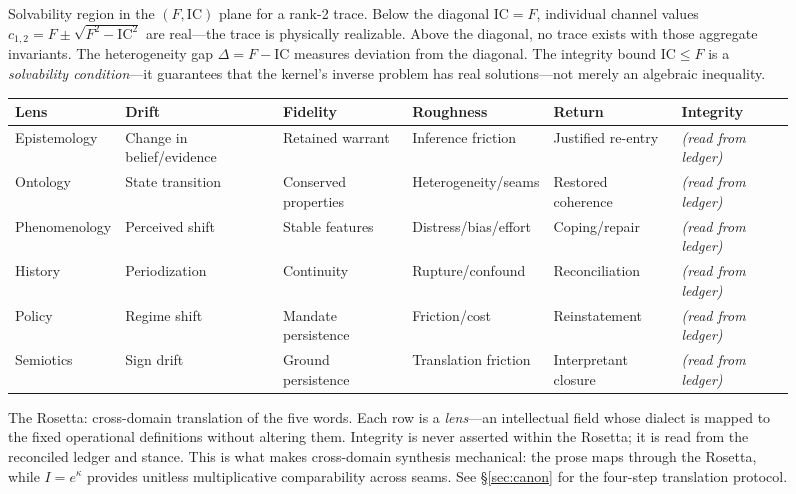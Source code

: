 \documentclass[
  aps,
  prd,
  twocolumn,
  superscriptaddress,
  nofootinbib,
  floatfix
]{revtex4-2}
\newcommand{\IC}{\mathrm{IC}}
\begin{document}
\begin{figure}[t!]
\caption{Solvability region in the $(F, \IC)$
plane for a rank-2 trace.  Below the
diagonal $\IC = F$, individual channel values
$c_{1,2} = F \pm \sqrt{F^2 - \IC^2}$ are real---the trace
is physically realizable.  Above the diagonal, no trace
exists with those aggregate invariants.  The heterogeneity
gap $\Delta = F - \IC$ measures deviation from the diagonal.
The integrity bound $\IC \leq F$ is a \emph{solvability
condition}---it guarantees that the kernel's inverse problem
has real solutions---not merely an algebraic inequality.}
\label{fig:solvability}
\end{figure}

\begin{figure}[t!]
\centering
\begin{tabular}{@{}llllll@{}}
\toprule
\textbf{Lens} & \textbf{Drift} & \textbf{Fidelity} & \textbf{Roughness} & \textbf{Return} & \textbf{Integrity} \\
\midrule
Epistemology &
  Change in belief/evidence &
  Retained warrant &
  Inference friction &
  Justified re-entry &
  \emph{(read from ledger)} \\[3pt]
Ontology &
  State transition &
  Conserved properties &
  Heterogeneity/seams &
  Restored coherence &
  \emph{(read from ledger)} \\[3pt]
Phenomenology &
  Perceived shift &
  Stable features &
  Distress/bias/effort &
  Coping/repair &
  \emph{(read from ledger)} \\[3pt]
History &
  Periodization &
  Continuity &
  Rupture/confound &
  Reconciliation &
  \emph{(read from ledger)} \\[3pt]
Policy &
  Regime shift &
  Mandate persistence &
  Friction/cost &
  Reinstatement &
  \emph{(read from ledger)} \\[3pt]
Semiotics &
  Sign drift &
  Ground persistence &
  Translation friction &
  Interpretant closure &
  \emph{(read from ledger)} \\
\bottomrule
\end{tabular}
\caption{The Rosetta: cross-domain translation of the five
words.  Each row is a \emph{lens}---an intellectual field
whose dialect is mapped to the fixed operational definitions
without altering them.  Integrity is never asserted within
the Rosetta; it is read from the reconciled ledger and
stance.  This is what makes cross-domain synthesis
mechanical: the prose maps through the Rosetta, while
$I = e^\kappa$ provides unitless multiplicative comparability
across seams.  See \S\ref{sec:canon} for the four-step
translation protocol.}
\label{fig:rosetta}
\end{figure}

\clearpage
\twocolumngrid

\end{document}
